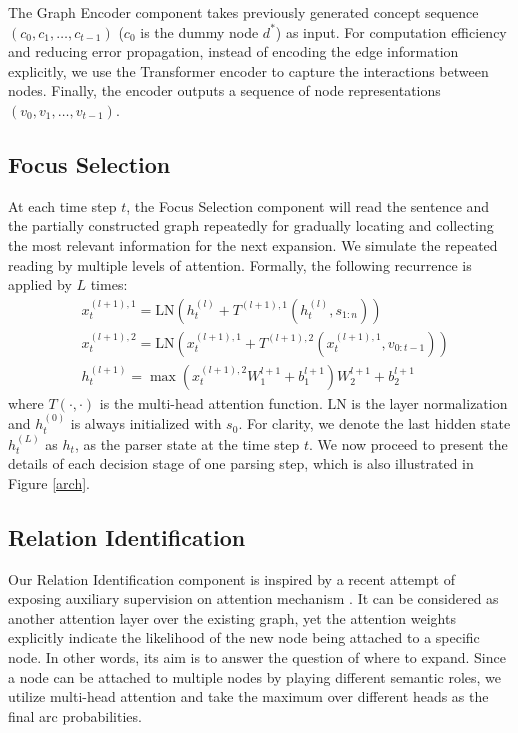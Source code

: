 \documentclass[11pt,a4paper]{article}
\begin{document}
	The Graph Encoder component takes previously generated concept sequence $(c_0, c_1, \ldots, c_{t-1})$ ($c_0$ is the dummy node $d^*$) as input. For computation efficiency and reducing error propagation, instead of encoding the edge information explicitly, we use the Transformer encoder to capture the interactions between nodes. Finally, the encoder outputs a sequence of node representations $(v_0, v_1, \dots, v_{t-1})$.
	\subsection{Focus Selection}
	\label{rr}
	At each time step $t$, the Focus Selection component will read the sentence and the partially constructed graph repeatedly for gradually locating and collecting the most relevant information for the next expansion. We simulate the repeated reading by multiple levels of attention. Formally, the following recurrence is applied by $L$ times:
	\begin{align*}
	&x^{(l+1),1}_t =\text{LN}( h^{(l)}_t+ T^{(l+1),1}(h^{(l)}_t, s_{1:n})) \\
	&x^{(l+1),2}_t = \text{LN}(x^{(l+1),1}_t+T^{(l+1), 2}(x^{(l+1),1}_t, v_{0:t-1}) )\\
	&h^{(l+1)}_t = \max(x^{(l+1),2}_t W^{l+1}_1 +b^{l+1}_1) W^{l+1}_2+b^{l+1}_2
	\end{align*}
	where $T(\cdot,\cdot)$ is the multi-head attention function. $\text{LN}$ is the layer normalization \cite{lei2016layer} and $h^{(0)}_t$ is always initialized with $s_0$. For clarity, we denote the last hidden state $h^{(L)}_t$ as $h_t$, as the parser state at the time step $t$. We now proceed to present the details of each decision stage of one parsing step, which is also illustrated in Figure \ref{arch}.
	\subsection{Relation Identification}
	\label{ri}
	Our Relation Identification component is inspired by a recent attempt of exposing auxiliary supervision on attention mechanism \cite{strubell-etal-2018-linguistically}. It can be considered as another attention layer over the existing graph, yet the attention weights explicitly indicate the likelihood of the new node being attached to a specific node. In other words, its aim is to answer the question of where to expand. Since a node can be attached to multiple nodes by playing different semantic roles, we utilize multi-head attention and take the maximum over different heads as the final arc probabilities.
	
\end{document}

